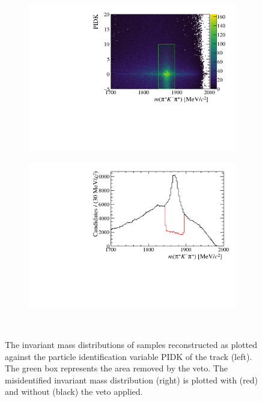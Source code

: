 \begin{figure}[!h]
    \centering
    \begin{subfigure}[t]{0.49\textwidth}
        \includegraphics[width=1.0\textwidth]{figs/Selection/B2DsPhi_Ds2KKPi_2D_D_Veto_NoBDT.pdf}
    \end{subfigure}%
    \begin{subfigure}[t]{0.49\textwidth}
        \includegraphics[width=1.0\textwidth]{figs/Selection/B2DsPhi_Ds2KKPi_D_Veto_NoBDT.pdf}
    \end{subfigure}\\
    \caption{The invariant mass distributions of \decay{\Dsp}{\Kp\Km\pip} samples reconstructed as \decay{\Dp}{\pip\Km\pip} plotted against the particle identification variable PIDK of the \Kp track (left). The green box represents the area removed by the veto. The misidentified invariant mass distribution (right) is plotted with (red) and without (black) the veto applied.}
    \label{fig:PIDVetos_Ds2KKPi_D_Veto}   
\end{figure}

